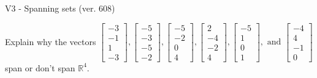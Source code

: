 \begin{exercise}
  \begin{exerciseTitle}V3 - Spanning sets (ver. 608)\end{exerciseTitle}
  \begin{exerciseStatement}
    Explain why the vectors \(\left[\begin{array}{r}
-3 \\
-1 \\
1 \\
-3
\end{array}\right] , \left[\begin{array}{r}
-5 \\
-3 \\
-5 \\
-2
\end{array}\right] , \left[\begin{array}{r}
-5 \\
-2 \\
0 \\
4
\end{array}\right] , \left[\begin{array}{r}
2 \\
-4 \\
-2 \\
4
\end{array}\right] , \left[\begin{array}{r}
-5 \\
1 \\
0 \\
1
\end{array}\right] , \text{ and } \left[\begin{array}{r}
-4 \\
4 \\
-1 \\
0
\end{array}\right]\) span or don't span \(\mathbb{R}^4\). 
	



\end{exerciseStatement}
\end{exercise}
